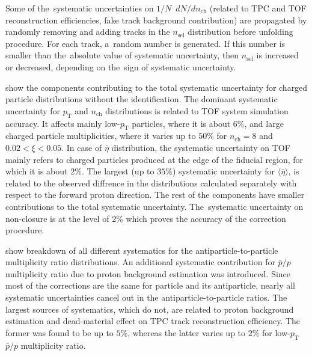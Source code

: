 Some of the~systematic uncertainties on $1/N$~$dN/dn_\textrm{ch}$ (related to TPC and TOF reconstruction efficiencies, fake track background contribution)  are propagated by randomly removing and adding tracks in the $n_\textrm{sel}$ distribution before  unfolding procedure. For each track, a~random number is generated. If this number is smaller than the~absolute value of systematic uncertainty, then $n_\textrm{sel}$ is increased or decreased, depending on the~sign of systematic uncertainty.



 show the components contributing to the total systematic uncertainty for charged particle distributions without the identification. The dominant systematic uncertainty for $p_\textrm{T}$ and $n_\textrm{ch}$ distributions is related to TOF system simulation accuracy. It affects mainly low-$p_\textrm{T}$ particles, where it is about $6\%$, and large charged particle multiplicities, where it varies up to $50\%$ for $n_\textrm{ch}=8$ and $0.02 < \xi < 0.05$. In case of $\bar{\eta}$ distribution, the systematic uncertainty on TOF mainly refers to charged particles produced at the edge of the fiducial region, for which it is about $2\%$.  The largest (up to $35\%$) systematic uncertainty for $\langle\bar{\eta}\rangle$,  is related to the observed diffrence  in the distributions calculated separately with respect to the forward proton direction. The rest of the components have smaller contributions to the total systematic uncertainty. The~systematic uncertainty on non-closure is at the level of $2\%$ which proves  the accuracy of the correction procedure. 



 show breakdown of all different systematics for the antiparticle-to-particle multiplicity ratio distributions. An additional systematic contribution for $\bar{p}/p$ multiplicity ratio due to proton background estimation was introduced.
Since most of the corrections are the same for particle and its antiparticle, nearly all systematic uncertainties cancel out in the antiparticle-to-particle ratios. 
The largest sources of systematics, which  do not, are related to proton background estimation and dead-material effect on TPC track reconstruction efficiency.  The former was found to be up to $5\%$, whereas the latter varies up to $2\%$ for low-$p_\textrm{T}$ $\bar{p}/p$ multiplicity ratio. 


